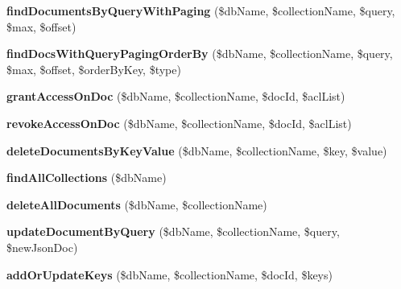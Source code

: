 \begin{DoxyCompactItemize}
\item 
\hypertarget{class_storage_service_a3117f4c4548f48353ff0f999ee4ce1d4}{{\bfseries find\+Documents\+By\+Query\+With\+Paging} (\$db\+Name, \$collection\+Name, \$query, \$max, \$offset)}\label{class_storage_service_a3117f4c4548f48353ff0f999ee4ce1d4}

\item 
\hypertarget{class_storage_service_a52f1ffb1943eda1903779639be12b8be}{{\bfseries find\+Docs\+With\+Query\+Paging\+Order\+By} (\$db\+Name, \$collection\+Name, \$query, \$max, \$offset, \$order\+By\+Key, \$type)}\label{class_storage_service_a52f1ffb1943eda1903779639be12b8be}

\item 
\hypertarget{class_storage_service_ab575a1da200f28730ef8cc4632853558}{{\bfseries grant\+Access\+On\+Doc} (\$db\+Name, \$collection\+Name, \$doc\+Id, \$acl\+List)}\label{class_storage_service_ab575a1da200f28730ef8cc4632853558}

\item 
\hypertarget{class_storage_service_ae7f920435a58600e5162ca434d224f13}{{\bfseries revoke\+Access\+On\+Doc} (\$db\+Name, \$collection\+Name, \$doc\+Id, \$acl\+List)}\label{class_storage_service_ae7f920435a58600e5162ca434d224f13}

\item 
\hypertarget{class_storage_service_a97b4ba5d61217201e6d39121096b2b87}{{\bfseries delete\+Documents\+By\+Key\+Value} (\$db\+Name, \$collection\+Name, \$key, \$value)}\label{class_storage_service_a97b4ba5d61217201e6d39121096b2b87}

\item 
\hypertarget{class_storage_service_abcee14be831c54b55d6bc3508b62983b}{{\bfseries find\+All\+Collections} (\$db\+Name)}\label{class_storage_service_abcee14be831c54b55d6bc3508b62983b}

\item 
\hypertarget{class_storage_service_ad49aafe42c71ab624f743af9e837f9ae}{{\bfseries delete\+All\+Documents} (\$db\+Name, \$collection\+Name)}\label{class_storage_service_ad49aafe42c71ab624f743af9e837f9ae}

\item 
\hypertarget{class_storage_service_ac5284402ac5d88f3b93884b780b7ef85}{{\bfseries update\+Document\+By\+Query} (\$db\+Name, \$collection\+Name, \$query, \$new\+Json\+Doc)}\label{class_storage_service_ac5284402ac5d88f3b93884b780b7ef85}

\item 
\hypertarget{class_storage_service_ae002de8c6b0a123c3e44461c4b5effcf}{{\bfseries add\+Or\+Update\+Keys} (\$db\+Name, \$collection\+Name, \$doc\+Id, \$keys)}\label{class_storage_service_ae002de8c6b0a123c3e44461c4b5effcf}


\end{DoxyCompactItemize}
